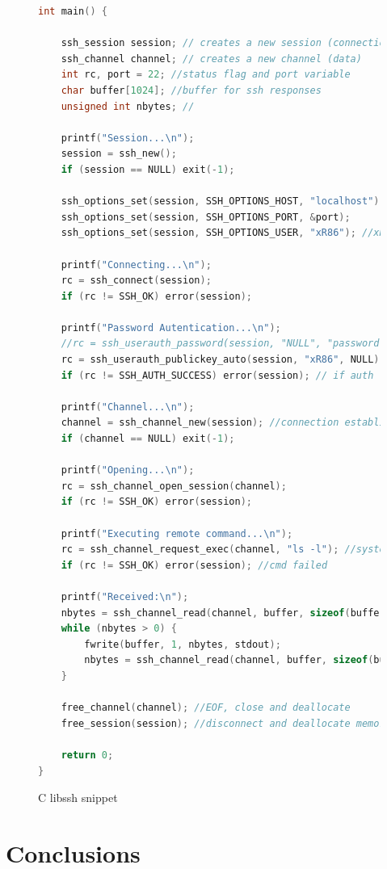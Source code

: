 \documentclass{llncs}
\begin{document}
\begin{figure}
\begin{lstlisting}[language=C]
int main() {

    ssh_session session; // creates a new session (connection)
    ssh_channel channel; // creates a new channel (data)
    int rc, port = 22; //status flag and port variable
    char buffer[1024]; //buffer for ssh responses
    unsigned int nbytes; //

    printf("Session...\n");
    session = ssh_new();
    if (session == NULL) exit(-1);

    ssh_options_set(session, SSH_OPTIONS_HOST, "localhost"); //localhost //192.168.100.2
    ssh_options_set(session, SSH_OPTIONS_PORT, &port);
    ssh_options_set(session, SSH_OPTIONS_USER, "xR86"); //xR86 //labsi

    printf("Connecting...\n");
    rc = ssh_connect(session);
    if (rc != SSH_OK) error(session);

    printf("Password Autentication...\n");
    //rc = ssh_userauth_password(session, "NULL", "password"); // second is username, third is password
    rc = ssh_userauth_publickey_auto(session, "xR86", NULL); //automatically looks in .ssh/ keys
    if (rc != SSH_AUTH_SUCCESS) error(session); // if auth fails, the program stops here

    printf("Channel...\n");
    channel = ssh_channel_new(session); //connection established
    if (channel == NULL) exit(-1);

    printf("Opening...\n");
    rc = ssh_channel_open_session(channel);
    if (rc != SSH_OK) error(session);

    printf("Executing remote command...\n");
    rc = ssh_channel_request_exec(channel, "ls -l"); //system call in remote machine
    if (rc != SSH_OK) error(session); //cmd failed

    printf("Received:\n");
    nbytes = ssh_channel_read(channel, buffer, sizeof(buffer), 0);
    while (nbytes > 0) {
        fwrite(buffer, 1, nbytes, stdout);
        nbytes = ssh_channel_read(channel, buffer, sizeof(buffer), 0);
    }

    free_channel(channel); //EOF, close and deallocate
    free_session(session); //disconnect and deallocate memory

    return 0;
}
\end{lstlisting}
	\centering
	\caption{C libssh snippet}
\end{figure}

%
\section{Conclusions}
%
\end{document}
